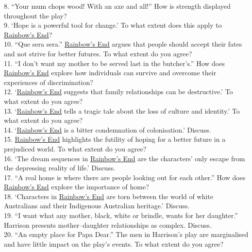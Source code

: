 \documentclass[a4paper]{article}
\begin{document}
8. “Your mum chops wood! With an axe and all!” How is strength displayed throughout the play?\\

9. ‘Hope is a powerful tool for change.’ To what extent does this apply to \underline{Rainbow’s End}?\\

10. “Que sera sera.” \underline{Rainbow’s End} argues that people should accept their fates and not strive for better futures. To what extent do you agree?\\

11. “I don’t want my mother to be served last in the butcher’s.” How does \underline{Rainbow’s End} explore how individuals can survive and overcome their experiences of discrimination?\\

12. ‘\underline{Rainbow’s End} suggests that family relationships can be destructive.’ To what extent do you agree?\\

13. ‘\underline{Rainbow’s End} tells a tragic tale about the loss of culture and identity.’ To what extent do you agree?\\

14. ‘\underline{Rainbow’s End} is a bitter condemnation of colonisation.’ Discuss.\\

15. \underline{Rainbow’s End} highlights the futility of hoping for a better future in a prejudiced world. To what extent do you agree?\\

16. ‘The dream sequences in \underline{Rainbow’s End} are the characters’ only escape from the depressing reality of life.’ Discuss.\\

17. “A real home is where there are people looking out for each other.” How does \underline{Rainbow’s End} explore the importance of home?\\

18. ‘Characters in \underline{Rainbow’s End} are torn between the world of white Australians and their Indigenous Australian heritage.’ Discuss.\\

19. “I want what any mother, black, white or brindle, wants for her daughter.” Harrison presents mother–daughter relationships as complex. Discuss.\\

20. “An empty place for Papa Dear.” The men in Harrison’s play are marginalised and have little impact on the play’s events. To what extent do you agree?\\
\end{document}
